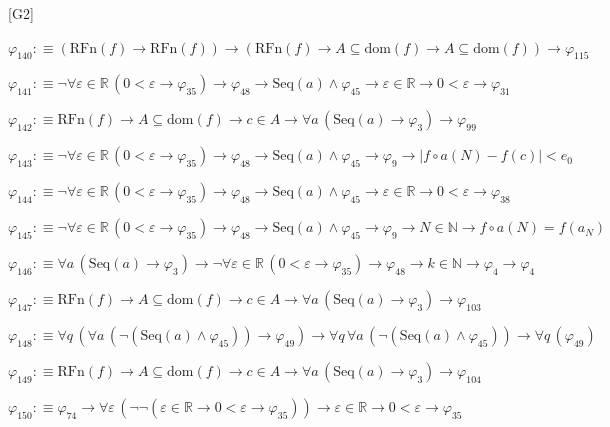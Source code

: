 \begin{fullproof}{[G2]}
\begin{abbrevlist}
\item $\varphi_{140} :\equiv (\mathrm{RFn}(f) \to \mathrm{RFn}(f)) \to (\mathrm{RFn}(f) \to A \subseteq \mathrm{dom}(f) \to A \subseteq \mathrm{dom}(f)) \to \varphi_{115}$
\item $\varphi_{141} :\equiv \neg \forall \varepsilon \in \mathbb{R}\,(0 < \varepsilon \to \varphi_{35}) \to \varphi_{48} \to \mathrm{Seq}(a) \land \varphi_{45} \to \varepsilon \in \mathbb{R} \to 0 < \varepsilon \to \varphi_{31}$
\item $\varphi_{142} :\equiv \mathrm{RFn}(f) \to A \subseteq \mathrm{dom}(f) \to c \in A \to \forall a\,(\mathrm{Seq}(a) \to \varphi_{3}) \to \varphi_{99}$
\item $\varphi_{143} :\equiv \neg \forall \varepsilon \in \mathbb{R}\,(0 < \varepsilon \to \varphi_{35}) \to \varphi_{48} \to \mathrm{Seq}(a) \land \varphi_{45} \to \varphi_{9} \to \lvert f \circ a(N) - f(c) \rvert < e_{0}$
\item $\varphi_{144} :\equiv \neg \forall \varepsilon \in \mathbb{R}\,(0 < \varepsilon \to \varphi_{35}) \to \varphi_{48} \to \mathrm{Seq}(a) \land \varphi_{45} \to \varepsilon \in \mathbb{R} \to 0 < \varepsilon \to \varphi_{38}$
\item $\varphi_{145} :\equiv \neg \forall \varepsilon \in \mathbb{R}\,(0 < \varepsilon \to \varphi_{35}) \to \varphi_{48} \to \mathrm{Seq}(a) \land \varphi_{45} \to \varphi_{9} \to N \in \mathbb{N} \to f \circ a(N) = f(a_{N})$
\item $\varphi_{146} :\equiv \forall a\,(\mathrm{Seq}(a) \to \varphi_{3}) \to \neg \forall \varepsilon \in \mathbb{R}\,(0 < \varepsilon \to \varphi_{35}) \to \varphi_{48} \to k \in \mathbb{N} \to \varphi_{4} \to \varphi_{4}$
\item $\varphi_{147} :\equiv \mathrm{RFn}(f) \to A \subseteq \mathrm{dom}(f) \to c \in A \to \forall a\,(\mathrm{Seq}(a) \to \varphi_{3}) \to \varphi_{103}$
\item $\varphi_{148} :\equiv \forall q\,(\forall a\,(\neg (\mathrm{Seq}(a) \land \varphi_{45})) \to \varphi_{49}) \to \forall q\,\forall a\,(\neg (\mathrm{Seq}(a) \land \varphi_{45})) \to \forall q\,(\varphi_{49})$
\item $\varphi_{149} :\equiv \mathrm{RFn}(f) \to A \subseteq \mathrm{dom}(f) \to c \in A \to \forall a\,(\mathrm{Seq}(a) \to \varphi_{3}) \to \varphi_{104}$
\item $\varphi_{150} :\equiv \varphi_{74} \to \forall \varepsilon\,(\neg \neg (\varepsilon \in \mathbb{R} \to 0 < \varepsilon \to \varphi_{35})) \to \varepsilon \in \mathbb{R} \to 0 < \varepsilon \to \varphi_{35}$

\end{abbrevlist}
\end{fullproof}

